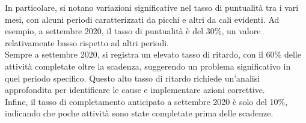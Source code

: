 \documentclass{article}
\begin{document}
In particolare, si notano variazioni significative nel tasso di puntualità tra i vari mesi, con alcuni periodi caratterizzati da picchi e altri da cali evidenti. Ad esempio, a settembre 2020, il tasso di puntualità è del 30\%, un valore relativamente basso rispetto ad altri periodi.\\
Sempre a settembre 2020, si registra un elevato tasso di ritardo, con il 60\% delle attività completate oltre la scadenza, suggerendo un problema significativo in quel periodo specifico. Questo alto tasso di ritardo richiede un'analisi approfondita per identificare le cause e implementare azioni correttive.\\
Infine, il tasso di completamento anticipato a settembre 2020 è solo del 10\%, indicando che poche attività sono state completate prima delle scadenze.\\
\end{document}

